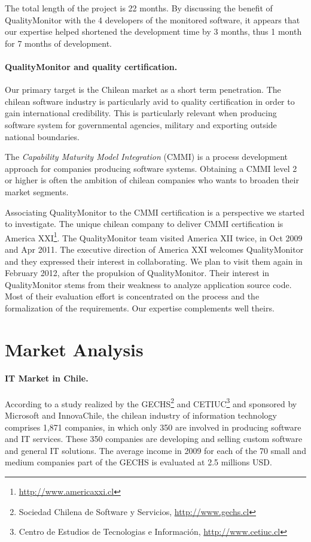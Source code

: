 \documentclass[runningheads]{llncs}
\begin{document}
The total length of the project is 22 months. By discussing the benefit of QualityMonitor with the 4 developers of the monitored software, it appears that our expertise helped shortened the development time by 3 months, thus 1 month for 7 months of development.

\paragraph{QualityMonitor and quality certification.}
Our primary target is the Chilean market as a short term penetration. The chilean software industry is particularly avid to quality certification in order to gain international credibility. This is particularly relevant when producing software system for governmental agencies, military and exporting outside national boundaries.

The \emph{Capability Maturity Model Integration} (CMMI) is a process development approach for companies producing software systems. Obtaining a CMMI level 2 or higher is often the ambition of chilean companies who wants to broaden their market segments.

Associating QualityMonitor to the CMMI certification is a perspective we started to investigate. The unique chilean company to deliver CMMI certification is America XXI\footnote{\url{http://www.americaxxi.cl}}. The QualityMonitor team visited America XII twice, in Oct 2009 and Apr 2011. The executive direction of America XXI welcomes QualityMonitor and they expressed their interest in collaborating. We plan to visit them again in February 2012, after the propulsion of QualityMonitor. Their interest in QualityMonitor stems from their weakness to analyze application source code. Most of their evaluation effort is concentrated on the process and the formalization of the requirements. Our expertise complements well theirs.



\section{Market Analysis}

\paragraph{IT Market in Chile.}
According to a study realized by the GECHS\footnote{Sociedad Chilena de Software y Servicios, \url{http://www.gechs.cl}} and CETIUC\footnote{Centro de Estudios de Tecnologias e Informaci\'on, \url{http://www.cetiuc.cl}} and sponsored by Microsoft and InnovaChile, the chilean industry of information technology comprises 1,871 companies, in which only 350 are involved in producing software and IT services. These 350 companies are developing and selling custom software and general IT solutions. 
The average income in 2009 for each of the 70 small and medium companies part of the GECHS is evaluated at 2.5 millions USD.
\end{document}
